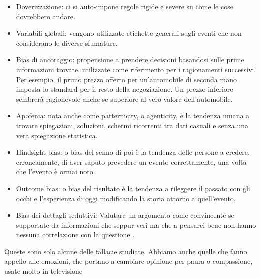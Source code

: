 \documentclass[12pt]{book} %
\begin{document}
\begin{itemize}
\item Doverizzazione: ci si auto-impone regole rigide e severe su come le cose dovrebbero andare.
\item Variabili globali: vengono utilizzate etichette generali sugli eventi che non considerano le diverse sfumature.
\item Bias di ancoraggio: propensione a prendere decisioni basandosi sulle prime informazioni trovate, utilizzate come
riferimento per i ragionamenti successivi. Per esempio, il primo prezzo offerto per un'automobile di seconda mano
imposta lo standard per il resto della negoziazione. Un prezzo inferiore sembrerà ragionevole anche se superiore al
vero valore dell'automobile.
\item Apofenia: nota anche come patternicity, o agenticity, è la tendenza umana a trovare spiegazioni, soluzioni,
schermi ricorrenti tra dati casuali e senza una vera spiegazione statistica.
\item Hindsight bias: o bias del senno di poi è la tendenza delle persone a credere, erroneamente, di aver saputo
prevedere un evento correttamente, una volta che l'evento è ormai noto. 
\item Outcome bias: o bias del risultato è la tendenza a rileggere il passato con gli occhi e
l'esperienza di oggi modificando la storia attorno a quell'evento.
\item Bias dei dettagli seduttivi: Valutare un argomento come convincente se supportate da informazioni che seppur veri
ma che a pensarci bene non hanno nessuna correlazione con la
questione
. 
\end{itemize}

\bigskip

Queste sono solo alcune delle fallacie studiate. Abbiamo anche quelle che fanno appello alle emozioni, che portano a
cambiare opinione per paura o compassione, usate molto in televisione


\bigskip
\end{document}
